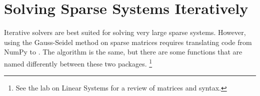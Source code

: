 \begin{comment} %
\begin{problem} %
The Gauss-Seidel method is faster than the standard system solver used by SciPy's \li{la.solve()} if the system is sufficiently large and sufficiently sparse.
For $n=5,6,\ldots,11$, generate a random $2^n \times 2^n$ matrix $A$ using \li{diag_dom()} and a random $2^n$ vector $\b$.
Time how long it takes to solve $A\x = \b$ using your Gauss-Seidel function from Problem \ref{prob:gauss_seidel}, and how long it takes to solve using \li{la.solve()}.
Make a log-log plot of the times against the system size.
\end{problem}
\end{comment}

\section*{Solving Sparse Systems Iteratively} %

Iterative solvers are best suited for solving very large sparse systems.
However, using the Gauss-Seidel method on sparse matrices requires translating code from NumPy to .
The algorithm is the same, but there are some functions that are named differently between these two packages.%
\footnote{See the lab on Linear Systems for a review of  matrices and syntax.}

